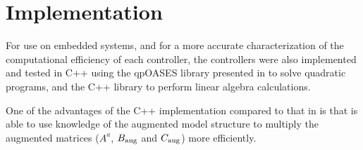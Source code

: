 \section{Implementation}
\label{sec:mpc:implementation}

For use on embedded systems, and for a more accurate characterization of the computational efficiency of each controller, the controllers were also implemented and tested in C++ using the qpOASES library presented in \cite{Ferreau2014} to solve quadratic programs, and the \eigen{}\cite{Eigen} C++ library to perform linear algebra calculations.


One of the advantages of the C++ implementation compared to that in \slink{} is that is able to use knowledge of the augmented model structure to multiply the augmented matrices ($A^a$, $B_\text{aug}$ and $C_\text{aug}$) more efficiently.



